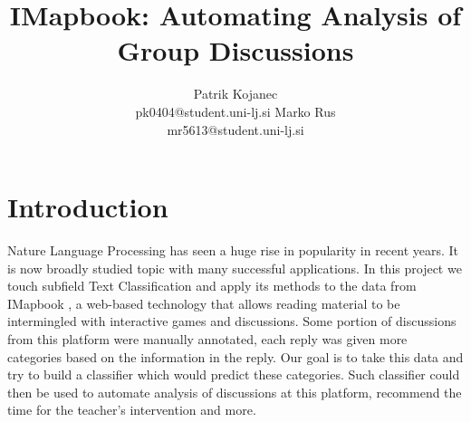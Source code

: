 \documentclass[11pt,a4paper]{article}
\title{IMapbook: Automating Analysis of Group Discussions}
\author{ \and }
\author{Patrik Kojanec \\ pk0404@student.uni-lj.si  
        \And
        Marko Rus \\ mr5613@student.uni-lj.si}
\date{}
\begin{document}
\maketitle


\section{Introduction}
Nature Language Processing has seen a huge rise in popularity in recent years. It is now broadly studied topic with many successful applications. In this project we touch subfield Text Classification and apply its methods to the data from IMapbook \cite{imapbook}, a web-based technology that allows reading material to be intermingled with interactive games and discussions. Some portion of discussions from this platform were manually annotated, each reply was given more categories based on the information in the reply. Our goal is to  take this data and try to build a classifier which would predict these categories. Such classifier could then be used to automate analysis of discussions at this platform, recommend the time for the teacher’s intervention and more.
\end{document}
